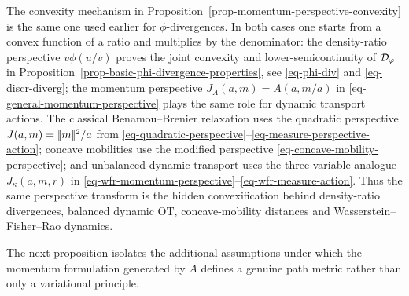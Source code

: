 \begin{rem}\label{rem-perspective-transform-convexity-link}
	The convexity mechanism in Proposition~\ref{prop-momentum-perspective-convexity} is the same one used earlier for $\phi$-divergences. In both cases one starts from a convex function of a ratio and multiplies by the denominator: the density-ratio perspective \(v\phi(u/v)\) proves the joint convexity and lower-semicontinuity of \(\mathcal{D}_\varphi\) in Proposition~\ref{prop-basic-phi-divergence-properties}, see \eqref{eq-phi-div} and \eqref{eq-discr-diverg}; the momentum perspective \(J_A(a,m)=A(a,m/a)\) in \eqref{eq-general-momentum-perspective} plays the same role for dynamic transport actions. The classical Benamou--Brenier relaxation uses the quadratic perspective \(J(a,m)=|\!| m |\!|^2/a\) from \eqref{eq-quadratic-perspective}--\eqref{eq-measure-perspective-action}; concave mobilities use the modified perspective \eqref{eq-concave-mobility-perspective}; and unbalanced dynamic transport uses the three-variable analogue \(J_\kappa(a,m,r)\) in \eqref{eq-wfr-momentum-perspective}--\eqref{eq-wfr-measure-action}. Thus the same perspective transform is the hidden convexification behind density-ratio divergences, balanced dynamic OT, concave-mobility distances and Wasserstein--Fisher--Rao dynamics.
\end{rem}

The next proposition isolates the additional assumptions under which the momentum formulation generated by \(A\) defines a genuine path metric rather than only a variational principle.

